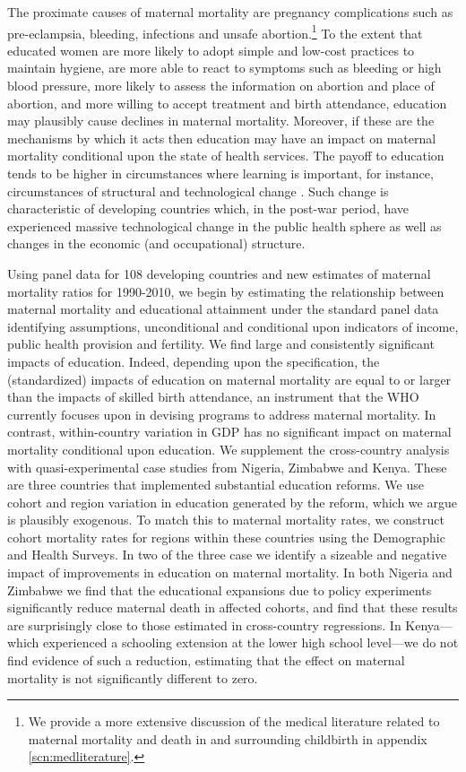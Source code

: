 \documentclass{article}[12pt,subeqn]
\begin{document}
\begin{spacing}{1.4}
The proximate causes of maternal mortality are pregnancy complications such as 
pre-eclampsia, bleeding, infections and unsafe abortion.\footnote{We provide a
more extensive discussion of the medical literature related to maternal mortality
and death in and surrounding childbirth in appendix \ref{scn:medliterature}.} To 
the extent that educated women are more likely to adopt simple and low-cost 
practices to maintain hygiene, are more able to react to symptoms such as bleeding 
or high blood pressure, more likely to assess the information on abortion and place 
of abortion, and more willing to accept
treatment and birth attendance, education may plausibly cause declines in maternal 
mortality. Moreover, if these are the mechanisms by which it acts then education 
may have an impact on maternal mortality conditional upon the state of health 
services. The payoff to education tends to be higher in circumstances where 
learning is important, for instance, circumstances of structural and technological 
change \citep{FosterRosenzweig2004}. Such change is characteristic of developing 
countries which, in the post-war period, have experienced massive technological 
change in the public health sphere \citep{Cutleretal2006} as well as changes in 
the economic (and occupational) structure.

Using panel data for 108 developing countries and new estimates of maternal 
mortality ratios for 1990-2010, we begin by estimating the relationship between
maternal mortality and educational attainment under the standard panel data
identifying assumptions, unconditional and conditional upon indicators of income,
public health provision and fertility. We find large and consistently significant
impacts of education. Indeed, depending upon the specification, the (standardized)
impacts of education on maternal mortality are equal to or larger than the impacts
of skilled birth attendance, an instrument that the WHO currently focuses upon in 
devising programs to address maternal mortality. In contrast, within-country 
variation in GDP has no significant impact on maternal mortality conditional upon 
education. We supplement the cross-country analysis with quasi-experimental case 
studies from Nigeria, Zimbabwe and Kenya. These are three countries that 
implemented substantial education reforms. We use cohort and region variation in 
education generated by the reform, which we argue is plausibly exogenous. To match 
this to maternal mortality rates, we construct cohort mortality rates for regions 
within these countries using the Demographic and Health Surveys. In two of the 
three case we identify a sizeable and negative impact of improvements in education 
on maternal mortality. In both Nigeria and Zimbabwe we find that the educational 
expansions due to policy experiments significantly reduce maternal death in
affected cohorts, and find that these results are surprisingly close to those 
estimated in cross-country regressions.  In Kenya---which experienced a schooling 
extension at the lower high school level---we do not find evidence of such a 
reduction, estimating that the effect on maternal mortality is not significantly 
different to zero.


\end{spacing}
\end{document}
